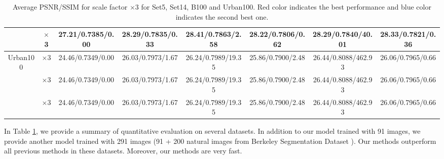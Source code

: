 \documentclass[10pt,twocolumn,letterpaper]{article}
\begin{document}
\begin{table}
\begin{center}
\begin{tabular}{ | c | c | c | c | c | c | c | c | }
 & $\times$3 & 27.21/0.7385/0.00 & 28.29/0.7835/0.33 & {\color{red}28.41}/{\color{red}0.7863}/2.58 & 28.22/0.7806/0.62 & 28.29/{\color{blue}0.7840}/40.01 & {\color{blue}28.33}/0.7821/0.36\\
\hline
\hline
\multirow{3}{*}{Urban100} & $\times$3 & 24.46/0.7349/0.00 & 26.03/0.7973/1.67 & {\color{blue}26.24}/{\color{blue}0.7989}/19.35 & 25.86/0.7900/2.48 & {\color{red}26.44}/{\color{red}0.8088}/462.93 & 26.06/0.7965/0.66\\
 & $\times$3 & 24.46/0.7349/0.00 & 26.03/0.7973/1.67 & {\color{blue}26.24}/{\color{blue}0.7989}/19.35 & 25.86/0.7900/2.48 & {\color{red}26.44}/{\color{red}0.8088}/462.93 & 26.06/0.7965/0.66\\
 & $\times$3 & 24.46/0.7349/0.00 & 26.03/0.7973/1.67 & {\color{blue}26.24}/{\color{blue}0.7989}/19.35 & 25.86/0.7900/2.48 & {\color{red}26.44}/{\color{red}0.8088}/462.93 & 26.06/0.7965/0.66\\
\hline
\end{tabular}
\caption{Average PSNR/SSIM for scale factor $\times$3 for Set5, Set14, B100 and Urban100. {\color{red}Red color} indicates the best performance and {\color{blue}blue color} indicates the second best one.} \label{table_all}
\end{center}
\end{table}

In Table \ref{table_all}, we provide a summary of quantitative evaluation on several datasets. In addition to our model trained with 91 images, we provide another model trained with 291 images (91 + 200 natural images from Berkeley Segmentation Dataset \cite{Martin2001}).
Our methods outperform all previous methods in these datasets. Moreover, our methods are very fast.
\end{document}
